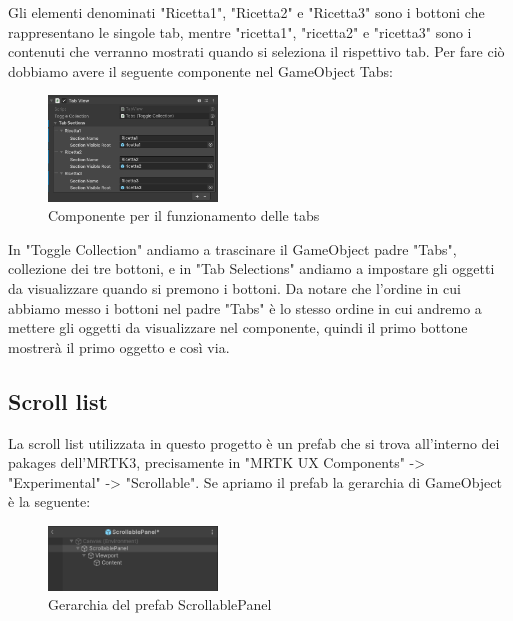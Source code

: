 Gli elementi denominati "Ricetta1", "Ricetta2" e "Ricetta3" sono i bottoni che rappresentano le singole tab, mentre "ricetta1", "ricetta2" e "ricetta3" sono i contenuti che verranno mostrati quando si seleziona il rispettivo tab. Per fare ciò dobbiamo avere il seguente componente nel GameObject Tabs:

\begin{figure}[H]
    \centering
    \includegraphics[width=0.4\textwidth,height=\textheight,keepaspectratio]{figures/chapter_1/componente-tabs.png}
    \caption{Componente per il funzionamento delle tabs}
\end{figure}

 In "Toggle Collection" andiamo a trascinare il GameObject padre "Tabs", collezione dei tre bottoni, e in "Tab Selections" andiamo a impostare gli oggetti da visualizzare quando si premono i bottoni. Da notare che l'ordine in cui abbiamo messo i bottoni nel padre "Tabs" è lo stesso ordine in cui andremo a mettere gli oggetti da visualizzare nel componente, quindi il primo bottone mostrerà il primo oggetto e così via. \cite{MRTKtabs}

\subsection{Scroll list}
La scroll list utilizzata in questo progetto è un prefab che si trova all'interno dei pakages dell'MRTK3, precisamente in "MRTK UX Components" -> "Experimental" -> "Scrollable". Se apriamo il prefab la gerarchia di GameObject è la seguente:

\begin{figure}[H]
    \centering
    \includegraphics[width=0.4\textwidth,height=\textheight,keepaspectratio]{figures/chapter_1/GerarchiascrollPanel.png}
    \caption{Gerarchia del prefab ScrollablePanel}
    \label{fig:scrollablePanel}
\end{figure}

